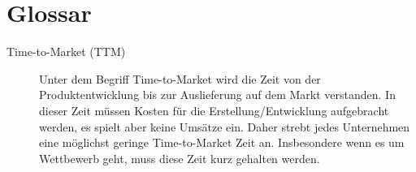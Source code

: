 \section{Glossar}
\label{sec:glossar}

\begin{description}
	\item[Time-to-Market (TTM)] Unter dem Begriff Time-to-Market wird die Zeit von der Produktentwicklung bis zur Auslieferung auf dem Markt verstanden. In dieser Zeit müssen Kosten für die Erstellung/Entwicklung aufgebracht werden, es spielt aber keine Umsätze ein. Daher strebt jedes Unternehmen eine möglichst geringe Time-to-Market Zeit an. Insbesondere wenn es um Wettbewerb geht, muss diese Zeit kurz gehalten werden.
\end{description}